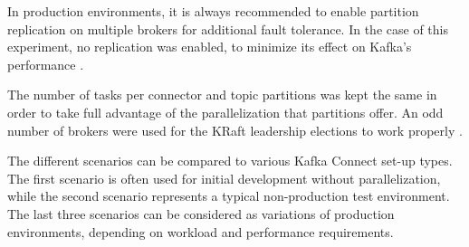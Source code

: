In production environments, it is always recommended to enable partition replication on multiple brokers for additional fault tolerance. In the case of this experiment, no replication was enabled, to minimize its effect on Kafka's performance \cite{dobbelaerekafkavsrabbitmq}.

The number of tasks per connector and topic partitions was kept the same in order to take full advantage of the parallelization that partitions offer. An odd number of brokers were used for the KRaft leadership elections to work properly \cite{kraftconfluentdocumentation}.

The different scenarios can be compared to various Kafka Connect set-up types. The first scenario is often used for initial development without parallelization, while the second scenario represents a typical non-production test environment. The last three scenarios can be considered as variations of production environments, depending on workload and performance requirements. %



\newpage
